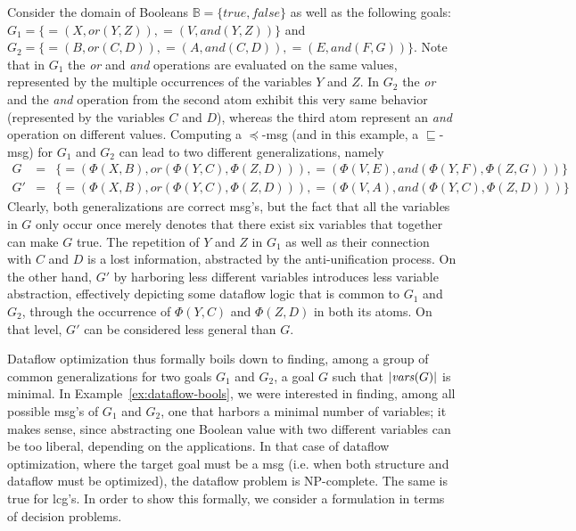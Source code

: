 \begin{example}\label{ex:dataflow-bools}
	Consider the domain of Booleans $\mathbb{B} = \{true, false\}$ as well as the following goals: $G_1 = \{=\!\!(X, or(Y, Z)), =\!\!(V, and(Y, Z))\}$ and $G_2 = \{=\!\!(B, or(C, D)), =\!\!(A, and(C, D)), =\!\!(E, and(F, G))\}$. 
	Note that in $G_1$ the \textit{or} and \textit{and} operations are evaluated on the same values, represented by the multiple occurrences of the variables $Y$ and $Z$. In $G_2$ the \textit{or} and the \textit{and} operation from the second atom exhibit this very same behavior (represented by the variables $C$ and $D$), whereas the third atom represent an \textit{and} operation on different values. 
	Computing a $\preceq$-msg (and in this example, a $\sqsubseteq$-msg) for $G_1$ and $G_2$ can lead to two different generalizations, namely
	\[
	\begin{array}{lll}
	G & = & \{=\!\!(\Phi(X,B), or(\Phi(Y,C), \Phi(Z,D))), =\!\!(\Phi(V, E), and(\Phi(Y, F), \Phi(Z,G)))\}\\ %
	G' & = & \{=\!\!(\Phi(X,B), or(\Phi(Y,C), \Phi(Z,D))), =\!\!(\Phi(V, A), and(\Phi(Y, C), \Phi(Z,D)))\}%
	\end{array}
	\] 
	Clearly, both generalizations are correct msg's, but the fact that all the variables in $G$ only occur once merely denotes that there exist six variables that together can make $G$ true. The repetition of $Y$ and $Z$ in $G_1$ as well as their connection with $C$ and $D$ is a lost information, abstracted by the anti-unification process. On the other hand, $G'$ by harboring less different variables introduces less variable abstraction, effectively depicting some dataflow logic that is common to $G_1$ and $G_2$, through the occurrence of $\Phi(Y,C)$ and $\Phi(Z,D)$ in both its atoms. On that level, $G'$ can be considered less general than $G$. 
\end{example}

Dataflow optimization thus formally boils down to finding, among a group of common generalizations for two goals $G_1$ and $G_2$, a goal $G$ such that $|\mathit{vars}(G)|$ is minimal. In Example~\ref{ex:dataflow-bools}, we were interested in finding, among all possible msg's of $G_1$ and $G_2$, one that harbors a minimal number of variables; it makes sense, since abstracting one Boolean value with two different variables can be too liberal, depending on the applications. In that case of dataflow optimization, where the target goal must be a msg (i.e. when both structure and dataflow must be optimized), the dataflow problem is NP-complete. The same is true for lcg's. In order to show this formally, we consider a formulation in terms of decision problems.

